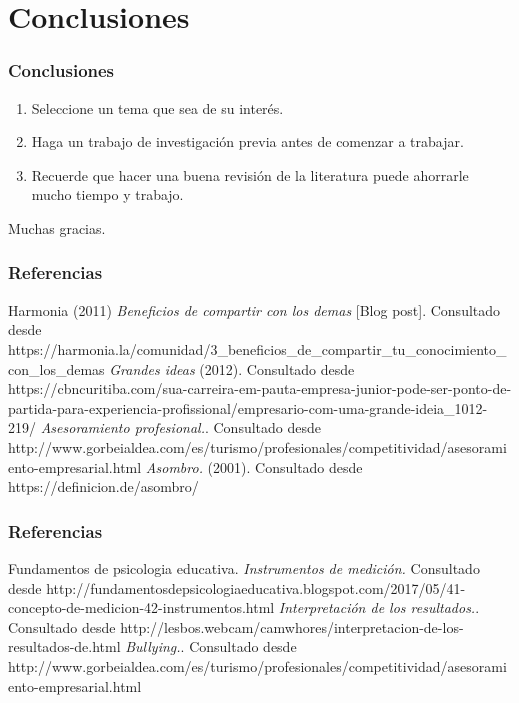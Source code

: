 \documentclass{beamer}
\begin{document}
\section{Conclusiones}
    \begin{frame}\frametitle{Conclusiones}
        \begin{enumerate}                    
            \item Seleccione un tema que sea de su inter\'es.
            \item Haga un trabajo de investigaci\'on previa antes de comenzar a trabajar. 
            \item Recuerde que hacer una buena revisi\'on de la literatura puede ahorrarle mucho tiempo y trabajo.                   
        \end{enumerate}   
    \end{frame}

    \begin{frame}%
    \begin{center}
    {\fontsize{25}{30}\selectfont Muchas gracias.}
    \end{center}
    \end{frame}

\begin{frame}\frametitle{Referencias}
    \begin{thebibliography}{1}
        \bibitem{[1]} Harmonia (2011) \emph{Beneficios de compartir con los demas} [Blog post]. Consultado desde https://harmonia.la/comunidad/3\_beneficios\_de\_compartir\_tu\_conocimiento\_con\_los\_demas
        \bibitem{[2]} \emph{Grandes ideas} (2012). Consultado desde https://cbncuritiba.com/sua-carreira-em-pauta-empresa-junior-pode-ser-ponto-de-partida-para-experiencia-profissional/empresario-com-uma-grande-ideia\_1012-219/ 
        \bibitem{[3]} \emph{Asesoramiento profesional.}. Consultado desde http://www.gorbeialdea.com/es/turismo/profesionales/competitividad/asesoramiento-empresarial.html
        \bibitem{[4]} \emph{Asombro.} (2001). Consultado desde https://definicion.de/asombro/   
    \end{thebibliography}
    \end{frame}

\begin{frame}\frametitle{Referencias}
    \begin{thebibliography}{1}
        \bibitem{[5]}Fundamentos de psicologia educativa. \emph{Instrumentos de medici\'on.} Consultado desde http://fundamentosdepsicologiaeducativa.blogspot.com/2017/05/41-concepto-de-medicion-42-instrumentos.html
        \bibitem{[6]} \emph{Interpretaci\'on de los resultados.}. Consultado desde http://lesbos.webcam/camwhores/interpretacion-de-los-resultados-de.html
        \bibitem{[7]} \emph{Bullying.}. Consultado desde http://www.gorbeialdea.com/es/turismo/profesionales/competitividad/asesoramiento-empresarial.html
   \end{thebibliography}
    \end{frame}
\end{document}
